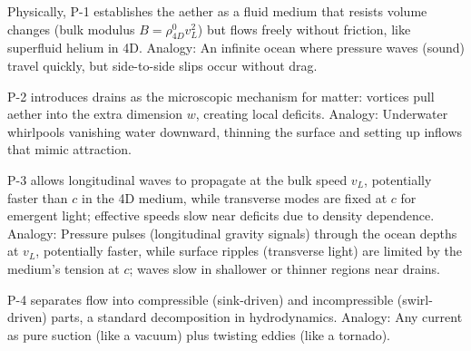 \documentclass{article}
\begin{document}

Physically, P-1 establishes the aether as a fluid medium that resists volume changes (bulk modulus $B = \rho_{4D}^0 v_L^2$) but flows freely without friction, like superfluid helium in 4D. Analogy: An infinite ocean where pressure waves (sound) travel quickly, but side-to-side slips occur without drag.

P-2 introduces drains as the microscopic mechanism for matter: vortices pull aether into the extra dimension $w$, creating local deficits. Analogy: Underwater whirlpools vanishing water downward, thinning the surface and setting up inflows that mimic attraction.

P-3 allows longitudinal waves to propagate at the bulk speed $v_L$, potentially faster than $c$ in the 4D medium, while transverse modes are fixed at $c$ for emergent light; effective speeds slow near deficits due to density dependence. Analogy: Pressure pulses (longitudinal gravity signals) through the ocean depths at $v_L$, potentially faster, while surface ripples (transverse light) are limited by the medium's tension at $c$; waves slow in shallower or thinner regions near drains.

P-4 separates flow into compressible (sink-driven) and incompressible (swirl-driven) parts, a standard decomposition in hydrodynamics. Analogy: Any current as pure suction (like a vacuum) plus twisting eddies (like a tornado).
\end{document}
